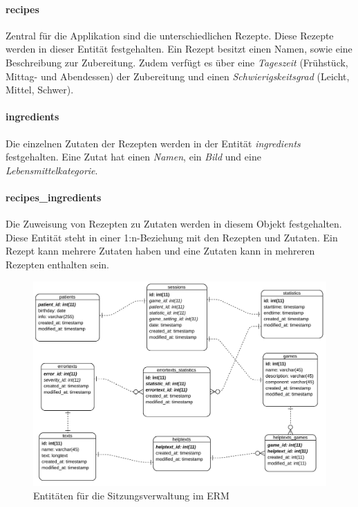\paragraph{recipes}
Zentral für die Applikation sind die unterschiedlichen Rezepte. Diese Rezepte werden in dieser Entität festgehalten. Ein Rezept besitzt einen Namen, sowie eine Beschreibung zur Zubereitung. Zudem verfügt es über eine \textit{Tageszeit} (Frühstück, Mittag- und Abendessen) der Zubereitung und einen \textit{Schwierigskeitsgrad} (Leicht, Mittel, Schwer).
    
\paragraph{ingredients}
Die einzelnen Zutaten der Rezepten werden in der Entität \textit{ingredients} festgehalten. Eine Zutat hat einen \textit{Namen}, ein \textit{Bild} und eine \textit{Lebensmittelkategorie}.
    
\paragraph{recipes\_ingredients}
Die Zuweisung von Rezepten zu Zutaten werden in diesem Objekt festgehalten. Diese Entität steht in einer 1:n-Beziehung mit den Rezepten und Zutaten. Ein Rezept kann mehrere Zutaten haben und eine Zutaten kann in mehreren Rezepten enthalten sein.

\begin{figure}[H]
	\includegraphics[width=1\linewidth]{figures/development/planning/er/sessions.png}
	\caption{Entitäten für die Sitzungsverwaltung im \acs{ERM}}
	\label{fig:er_sessions}
\end{figure}

